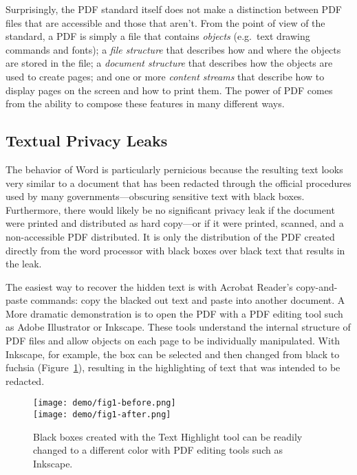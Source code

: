 Surprisingly, the PDF standard itself does not make a distinction
between PDF files that are accessible and those that aren't. From the
point of view of the standard, a PDF is simply a file that contains
\emph{objects} (e.g.\ text drawing commands and fonts); a \emph{file
  structure} that describes how and where the objects are stored in
the file; a \emph{document structure} that describes how the objects
are used to create pages; and one or more \emph{content streams} that
describe how to display pages on the screen and how to print them.  The
power of  PDF comes from the ability to compose  these features in  many different ways. 


\subsection{Textual Privacy Leaks}


The behavior of Word is particularly pernicious because the resulting
text looks very similar to a document that has been redacted through
the official procedures used by many governments---obscuring sensitive
text with black boxes. Furthermore, there would likely be no
significant privacy leak if the document were printed and
distributed as hard copy---or if it were printed, scanned, and a non-accessible PDF
distributed. It is only the distribution of the PDF created directly
from the word processor with black boxes over black text that results in the leak.

The easiest way to recover the hidden text is with Acrobat Reader's
copy-and-paste commands: copy the blacked out text and paste into
another document. A More dramatic demonstration is to open the PDF
with a PDF editing tool such as Adobe Illustrator or Inkscape. These
tools understand the internal structure of PDF files and allow objects
on each page to be individually manipulated. With Inkscape, for
example, the box can be selected and then changed from black to
fuchsia (Figure~\ref{fuschia}), resulting in the highlighting of text
that was intended to be redacted.

\begin{figure}
\texttt{[image: demo/fig1-before.png]}\\
\texttt{[image: demo/fig1-after.png]}
\caption{Black boxes created with the Text Highlight tool can be
  readily changed to a different color with PDF editing tools such as Inkscape.}\label{fuschia}
\end{figure}

